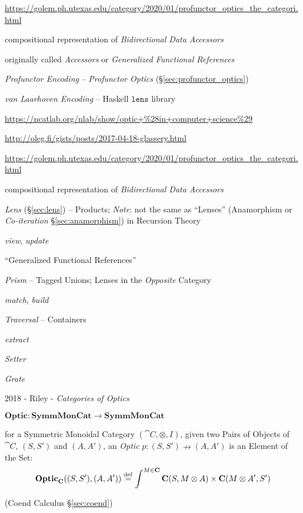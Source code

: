 
\url{https://golem.ph.utexas.edu/category/2020/01/profunctor_optics_the_categori.html}

compositional representation of \emph{Bidirectional Data Accessors}

originally called \emph{Accessors} or \emph{Generalized Functional References}

\emph{Profunctor Encoding} -- \emph{Profunctor Optics}
(\S\ref{sec:profunctor_optics})

\emph{van Laarhoven Encoding} -- Haskell $\mathtt{lens}$ library


\url{https://ncatlab.org/nlab/show/optic+%28in+computer+science%29}

\url{http://oleg.fi/gists/posts/2017-04-18-glassery.html}

\url{https://golem.ph.utexas.edu/category/2020/01/profunctor_optics_the_categori.html}

compositional representation of \emph{Bidirectional Data Accessors}

\emph{Lens} (\S\ref{sec:lens}) -- Products; \emph{Note}: not the same as
``Lenses'' (Anamorphism or \emph{Co-iteration} \S\ref{sec:anamorphism}) in
Recursion Theory

\emph{view}, \emph{update}

``Generalized Functional References''

\emph{Prism} -- Tagged Unions; Lenses in the \emph{Opposite} Category

\emph{match}, \emph{build}

\emph{Traversal} -- Containers

\emph{extract}

\emph{Setter}

\emph{Grate}

2018 - Riley - \emph{Categories of Optics}

$\mathbf{Optic} : \mathbf{SymmMonCat} \rightarrow \mathbf{SymmMonCat}$

for a Symmetric Monoidal Category $(\cat{C}, \otimes, I)$, given two Pairs of
Objects of $\cat{C}$, $(S, S')$ and $(A, A')$, an \emph{Optic}
$p : (S, S') \nrightarrow (A, A')$ is an Element of the Set:
\[
  \mathbf{Optic}_\mathbf{C} ((S, S'), (A, A')) \stackrel{\mathrm{def}}=
    \int^{M\in\mathbf{C}} \mathbf{C}(S, M \otimes A) \times \mathbf{C}(M \otimes A', S')
\]

(Coend Calculus \S\ref{sec:coend})

